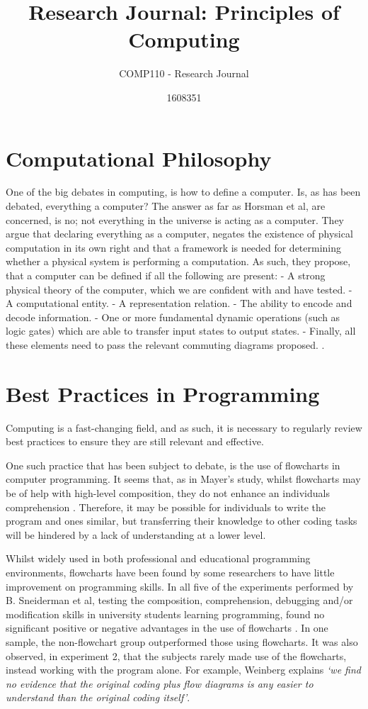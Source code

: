 \documentclass{scrartcl}
\title{Research Journal: Principles of Computing}
\subtitle{COMP110 - Research Journal}
\author{1608351}
\begin{document}
\section{Computational Philosophy}

One of the big debates in computing, is how to define a computer. Is, as has been debated, everything a computer? The answer as far as Horsman et al, are concerned, is no; not everything in the universe is acting as a computer. They argue that declaring everything as a computer, negates the existence of physical computation in its own right and that a framework is needed for determining whether a physical system is performing a computation. As such, they propose, that a computer can be defined if all the following are present:
- A strong physical theory of the computer, which we are confident with and have tested.
- A computational entity.
- A representation relation.
- The ability to encode and decode information.
- One or more fundamental dynamic operations (such as logic gates) which are able to transfer input states to output states. 
- Finally, all these elements need to pass the relevant commuting diagrams proposed. \cite{Horsman2014}. 


\section{Best Practices in Programming}

Computing is a fast-changing field, and as such, it is necessary to regularly review best practices to ensure they are still relevant and effective. 

One such practice that has been subject to debate, is the use of flowcharts in computer programming. It seems that, as in Mayer's study, whilst flowcharts may be of help with high-level composition, they do not enhance an individuals comprehension \cite{Mayer}. Therefore, it may be possible for individuals to write the program and ones similar, but transferring their knowledge to other coding tasks will be hindered by a lack of understanding at a lower level. 

Whilst widely used in both professional and educational programming environments, flowcharts have been found by some researchers to have little improvement on programming skills. In all five of the experiments performed by B. Sneiderman et al, testing the composition, comprehension, debugging and/or modification skills in university students learning programming, found no significant positive or negative advantages in the use of flowcharts \cite{Sneiderman}. In one sample, the non-flowchart group outperformed those using flowcharts. It was also observed, in experiment 2, that the subjects rarely made use of the flowcharts, instead working with the program alone. For example, Weinberg explains \textit{`we find no evidence that the original coding plus flow diagrams is any easier to understand than the original coding itself'}\cite{Weinberg}. 
\end{document}
